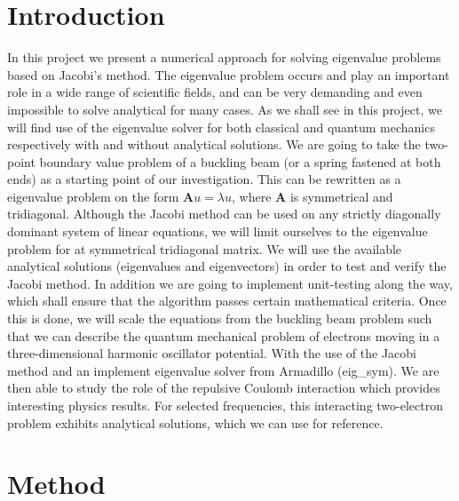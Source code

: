 \documentclass[american,a4paper,12pt]{article}
\renewcommand{\vec}[1]{\mathbf{#1}} %
\begin{document}
\section{Introduction}
In this project we present a numerical approach for solving eigenvalue problems based on Jacobi's method. The eigenvalue problem occurs and play an important role in a wide range of scientific fields, 
and can be very demanding and even impossible to solve analytical for many cases. As we shall see in this project, we will find use of the eigenvalue solver for both classical and quantum mechanics respectively with and without analytical solutions. We are going to take the two-point boundary value problem of a buckling beam (or a spring fastened at both ends) as a starting point of our investigation. This can be rewritten as a eigenvalue problem on the form $\vec{A}u = \lambda u$, where $\vec{A}$ is symmetrical and tridiagonal. Although the Jacobi method can be used on any strictly diagonally dominant system of linear equations, we will limit ourselves to the eigenvalue problem for at symmetrical tridiagonal matrix. We will use the available analytical solutions (eigenvalues and eigenvectors) in order to test and verify the Jacobi method. In addition we are going to implement unit-testing along the way, which shall ensure that the algorithm passes certain mathematical criteria. Once this is done, we will scale the equations from the buckling beam problem such that we can describe the quantum mechanical problem of electrons moving in a three-dimensional harmonic oscillator potential. With the use of the Jacobi method and an implement eigenvalue solver from Armadillo (eig\_sym)\cite{arma}. We are then able to study the role of the repulsive Coulomb interaction which provides interesting physics results. For selected frequencies, this interacting two-electron problem exhibits analytical solutions, which we can use for reference.
\section{Method}
\end{document}
